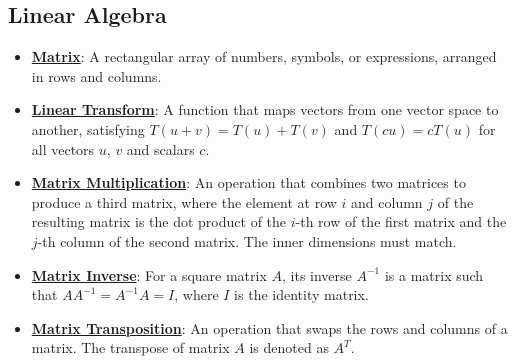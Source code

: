 \documentclass{article}%
\begin{document}
\subsection{Linear Algebra}%
\label{subsec:LinearAlgebra}%
\begin{itemize}[leftmargin=*]%
\item \href{https://purdue.brightspace.com/d2l/common/assets/pdfjs-d2l-dist/1.0.14-legacy/web/viewer.html?file=%2Fcontent%2Fenforced%2F1095467-wl.202510.CS.24300.001%2F04L1-Linear Algebra Primer.pdf%3Fou%3D1095467&lang=en-us&container=d2l-fileviewer-rendered-pdf&fullscreen=d2l-fileviewer-rendered-pdf-dialog&height=667#page=4}{\textbf{Matrix}}: A rectangular array of numbers, symbols, or expressions, arranged in rows and columns.%
\item \href{https://purdue.brightspace.com/d2l/common/assets/pdfjs-d2l-dist/1.0.14-legacy/web/viewer.html?file=%2Fcontent%2Fenforced%2F1095467-wl.202510.CS.24300.001%2F04L1-Linear Algebra Primer.pdf%3Fou%3D1095467&lang=en-us&container=d2l-fileviewer-rendered-pdf&fullscreen=d2l-fileviewer-rendered-pdf-dialog&height=667#page=5}{\textbf{Linear Transform}}: A function that maps vectors from one vector space to another, satisfying $T(u + v) = T(u) + T(v)$ and $T(cu) = cT(u)$ for all vectors $u$, $v$ and scalars $c$.%
\item \href{https://purdue.brightspace.com/d2l/common/assets/pdfjs-d2l-dist/1.0.14-legacy/web/viewer.html?file=%2Fcontent%2Fenforced%2F1095467-wl.202510.CS.24300.001%2F04L1-Linear Algebra Primer.pdf%3Fou%3D1095467&lang=en-us&container=d2l-fileviewer-rendered-pdf&fullscreen=d2l-fileviewer-rendered-pdf-dialog&height=667#page=14}{\textbf{Matrix Multiplication}}: An operation that combines two matrices to produce a third matrix, where the element at row $i$ and column $j$ of the resulting matrix is the dot product of the $i$-th row of the first matrix and the $j$-th column of the second matrix. The inner dimensions must match.%
\item \href{https://purdue.brightspace.com/d2l/common/assets/pdfjs-d2l-dist/1.0.14-legacy/web/viewer.html?file=%2Fcontent%2Fenforced%2F1095467-wl.202510.CS.24300.001%2F04L1-Linear Algebra Primer.pdf%3Fou%3D1095467&lang=en-us&container=d2l-fileviewer-rendered-pdf&fullscreen=d2l-fileviewer-rendered-pdf-dialog&height=667#page=10}{\textbf{Matrix Inverse}}: For a square matrix $A$, its inverse $A^{-1}$ is a matrix such that $AA^{-1} = A^{-1}A = I$, where $I$ is the identity matrix.%
\item \href{https://purdue.brightspace.com/d2l/common/assets/pdfjs-d2l-dist/1.0.14-legacy/web/viewer.html?file=%2Fcontent%2Fenforced%2F1095467-wl.202510.CS.24300.001%2F04L1-Linear Algebra Primer.pdf%3Fou%3D1095467&lang=en-us&container=d2l-fileviewer-rendered-pdf&fullscreen=d2l-fileviewer-rendered-pdf-dialog&height=667#page=16}{\textbf{Matrix Transposition}}: An operation that swaps the rows and columns of a matrix. The transpose of matrix $A$ is denoted as $A^T$.%

\end{itemize}
\end{document}
